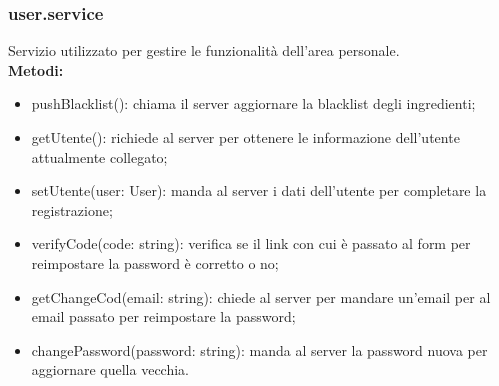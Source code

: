 \subsubsection{user.service}
Servizio utilizzato per gestire le funzionalità dell'area personale.\\
\textbf{Metodi:}
\begin{itemize}
    \item pushBlacklist(): chiama il server aggiornare la blacklist degli ingredienti;
    \item getUtente(): richiede al server per ottenere le informazione dell'utente attualmente collegato;
    \item setUtente(user: User): manda al server i dati dell'utente per completare la registrazione;
    \item verifyCode(code: string): verifica se il link con cui è passato al form per reimpostare la password è corretto o no;
    \item getChangeCod(email: string): chiede al server per mandare un'email per al email passato per reimpostare la password;
    \item changePassword(password: string): manda al server la password nuova per aggiornare quella vecchia.
\end{itemize}